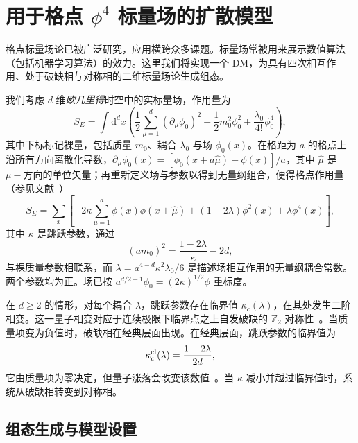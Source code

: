 \section{用于格点 $\phi^4$ 标量场的扩散模型}
\label{sec:phi4}

格点标量场论已被广泛研究，应用横跨众多课题。标量场常被用来展示数值算法（包括机器学习算法）的效力。这里我们将实现一个 DM，为具有四次相互作用、处于破缺相与对称相的二维标量场论生成组态。

我们考虑 $d$ 维\textit{欧几里得}时空中的实标量场，作用量为
\begin{equation}
S_E = \int \text{d}^{d}x\left( \frac{1}{2}\sum_{\mu=1}^d\left(\partial_\mu\phi_0\right)^2 + \frac{1}{2} m_0^2\phi_0^2 + \frac{\lambda_0}{4!}\phi_0^4 \right),
\end{equation}
其中下标标记裸量，包括质量 $m_0$、耦合 $\lambda_0$ 与场 $\phi_0(x)$。在格距为 $a$ 的格点上沿所有方向离散化导数，$\partial_\mu\phi_0(x)=[\phi_0(x+a\hat\mu)-\phi(x)]/a$，其中 $\hat{\mu}$ 是 $\mu-$方向的单位矢量；再重新定义场与参数以得到无量纲组合，便得格点作用量（参见文献~\cite{Smit:2002ug}）
\begin{equation}
S_E = \sum_x \left[  -2\kappa \sum_{\mu = 1}^d\phi(x)\phi(x+\hat{\mu}) + (1-2\lambda)\phi^2(x) + \lambda\phi^4(x) \right],
\label{eq:phi4action}
\end{equation}
其中 $\kappa$ 是跳跃参数，通过
\begin{equation}
     (am_0)^2 = \frac{1-2\lambda}{\kappa} - 2d,
\end{equation}
与裸质量参数相联系，而 $\lambda=a^{4-d}\kappa^2\lambda_0/6$ 是描述场相互作用的无量纲耦合常数。两个参数均为正。场已按 $a^{d/2-1}\phi_0=(2\kappa)^{1/2}\phi$ 重标度。

在 $d\geq2$ 的情形，对每个耦合 $\lambda$，跳跃参数存在临界值 $\kappa_c(\lambda)$，在其处发生二阶相变。这一量子相变对应于连续极限下临界点之上自发破缺的 $\mathbb{Z}_2$ 对称性~\cite{Akiyama:2021zhf}。当质量项变为负值时，破缺相在经典层面出现。在经典层面，跳跃参数的临界值为
\begin{equation}
    \kappa_\text{c}^{\rm cl}(\lambda) = \frac{1-2\lambda}{2d},\label{eq:kc}
\end{equation}
它由质量项为零决定，但量子涨落会改变该数值~\cite{Smit:2002ug}。当 $\kappa$ 减小并越过临界值时，系统从破缺相转变到对称相。


\subsection{组态生成与模型设置}

